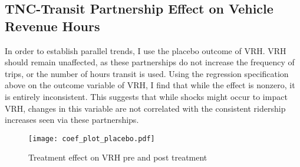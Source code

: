 \documentclass [12pt]{report}
\begin{document}
\subsection*{TNC-Transit Partnership Effect on Vehicle Revenue Hours}
In order to establish parallel trends, I use the placebo outcome of VRH. VRH should remain unaffected, as these partnerships do not increase the frequency of trips, or the number of hours transit is used. Using the regression specification above on the outcome variable of VRH, I find that while the effect is nonzero, it is entirely inconsistent. This suggests that while shocks might occur to impact VRH, changes in this variable are not correlated with the consistent ridership increases seen via these partnerships.
\begin{figure}[H]
    \centering
    \texttt{[image: coef\_plot\_placebo.pdf]} %
    \caption{Treatment effect on VRH pre and post treatment}
\end{figure}


\end{document}
